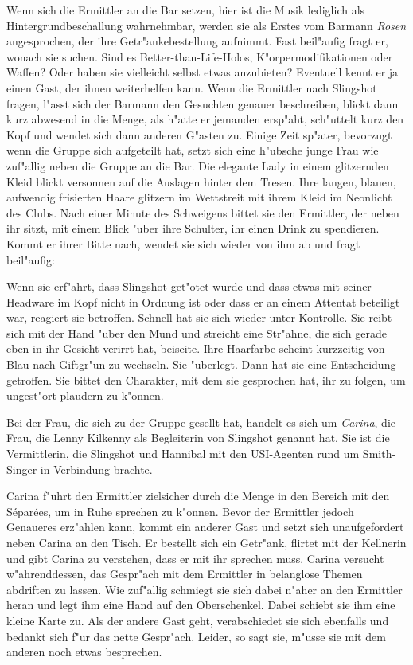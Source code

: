 Wenn sich die Ermittler an die Bar setzen, hier ist die Musik lediglich als Hintergrundbeschallung wahrnehmbar, werden sie als Erstes vom Barmann \emph{Rosen} angesprochen, der ihre Getr"ankebestellung aufnimmt. Fast beil"aufig fragt er, wonach sie suchen. Sind es Better-than-Life-Holos, K"orpermodifikationen oder Waffen? Oder haben sie vielleicht selbst etwas anzubieten? Eventuell kennt er ja einen Gast, der ihnen weiterhelfen kann. Wenn die Ermittler nach Slingshot fragen, l"asst sich der Barmann den Gesuchten genauer beschreiben, blickt dann kurz abwesend in die Menge, als h"atte er jemanden ersp"aht, sch"uttelt kurz den Kopf und wendet sich dann anderen G"asten zu. Einige Zeit sp"ater, bevorzugt wenn die Gruppe sich aufgeteilt hat, setzt sich eine h"ubsche junge Frau wie zuf"allig neben die Gruppe an die Bar. Die elegante Lady in einem glitzernden Kleid blickt versonnen auf die Auslagen hinter dem Tresen. Ihre langen, blauen, aufwendig frisierten Haare glitzern im Wettstreit mit ihrem Kleid im Neonlicht des Clubs. Nach einer Minute des Schweigens bittet sie den Ermittler, der neben ihr sitzt, mit einem Blick "uber ihre Schulter, ihr einen Drink zu spendieren. Kommt er ihrer Bitte nach, wendet sie sich wieder von ihm ab und fragt beil"aufig:


Wenn sie erf"ahrt, dass Slingshot get"otet wurde und dass etwas mit seiner Headware im Kopf nicht in Ordnung ist oder dass er an einem Attentat beteiligt war, reagiert sie betroffen. Schnell hat sie sich wieder unter Kontrolle. Sie reibt sich mit der Hand "uber den Mund und streicht eine Str"ahne, die sich gerade eben in ihr Gesicht verirrt hat, beiseite. Ihre Haarfarbe scheint kurzzeitig von Blau nach Giftgr"un zu wechseln. Sie "uberlegt. Dann hat sie eine Entscheidung getroffen. Sie bittet den Charakter, mit dem sie gesprochen hat, ihr zu folgen, um ungest"ort plaudern zu k"onnen.

Bei der Frau, die sich zu der Gruppe gesellt hat, handelt es sich um \emph{Carina}, die Frau, die Lenny Kilkenny als Begleiterin von Slingshot genannt hat. Sie ist die Vermittlerin, die Slingshot und Hannibal mit den USI-Agenten rund um Smith-Singer in Verbindung brachte.

Carina f"uhrt den Ermittler zielsicher durch die Menge in den Bereich mit den S\'epar\'ees, um in Ruhe sprechen zu k"onnen. Bevor der Ermittler jedoch Genaueres erz"ahlen kann, kommt ein anderer Gast und setzt sich unaufgefordert neben Carina an den Tisch. Er bestellt sich ein Getr"ank, flirtet mit der Kellnerin und gibt Carina zu verstehen, dass er mit ihr sprechen muss. Carina versucht w"ahrenddessen, das Gespr"ach mit dem Ermittler in belanglose Themen abdriften zu lassen. Wie zuf"allig schmiegt sie sich dabei n"aher an den Ermittler heran und legt ihm eine Hand auf den Oberschenkel. Dabei schiebt sie ihm eine kleine Karte zu. Als der andere Gast geht, verabschiedet sie sich ebenfalls und bedankt sich f"ur das nette Gespr"ach. Leider, so sagt sie, m"usse sie mit dem anderen noch etwas besprechen.


